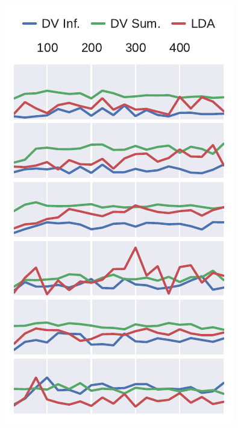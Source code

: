 \begin{figure}
\begin{minipage}[t]{0.265\textwidth}
        \includegraphics[width=\linewidth]{figures/mrr_graph}
        \label{fig:mrr}%
    \end{minipage}
\end{figure}


